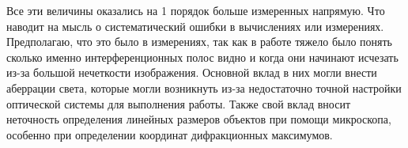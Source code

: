 \documentclass[a4paper,12pt]{article} %
\begin{document}
 Все эти величины оказались на 1 порядок больше измеренных напрямую. Что наводит на мысль о систематический ошибки в вычислениях или измерениях. Предполагаю, что это было в измерениях, так как в работе тяжело было понять сколько именно интерференционных полос видно и когда они начинают исчезать из-за большой нечеткости изображения. Основной вклад в них могли внести аберрации света, которые могли возникнуть из-за недостаточно точной настройки оптической системы для выполнения работы. Также свой вклад вносит неточность определения линейных размеров объектов при помощи микроскопа, особенно при определении координат дифракционных максимумов.
\end{document}
